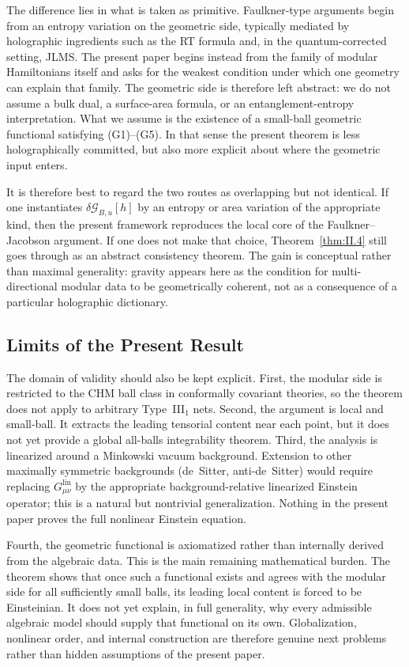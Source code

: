 \documentclass[12pt]{article}
\theoremstyle{definition}
\theoremstyle{remark}
\begin{document}
The difference lies in what is taken as primitive. Faulkner-type arguments begin from an entropy variation on the geometric side, typically mediated by holographic ingredients such as the RT formula\cite{RyuTakayanagi2006} and, in the quantum-corrected setting, JLMS\cite{JLMS2016}. The present paper begins instead from the family of modular Hamiltonians itself and asks for the weakest condition under which one geometry can explain that family. The geometric side is therefore left abstract: we do not assume a bulk dual, a surface-area formula, or an entanglement-entropy interpretation. What we assume is the existence of a small-ball geometric functional satisfying (G1)--(G5). In that sense the present theorem is less holographically committed, but also more explicit about where the geometric input enters.

It is therefore best to regard the two routes as overlapping but not identical. If one instantiates \(\delta\mathcal{G}_{B,u}[h]\) by an entropy or area variation of the appropriate kind, then the present framework reproduces the local core of the Faulkner--Jacobson argument. If one does not make that choice, Theorem~\ref{thm:II.4} still goes through as an abstract consistency theorem. The gain is conceptual rather than maximal generality: gravity appears here as the condition for multi-directional modular data to be geometrically coherent, not as a consequence of a particular holographic dictionary.

\subsection{Limits of the Present Result}\label{subsec:6.3}

The domain of validity should also be kept explicit. First, the modular side is restricted to the CHM ball class in conformally covariant theories, so the theorem does not apply to arbitrary Type~III$_1$ nets. Second, the argument is local and small-ball. It extracts the leading tensorial content near each point, but it does not yet provide a global all-balls integrability theorem. Third, the analysis is linearized around a Minkowski vacuum background. Extension to other maximally symmetric backgrounds (de~Sitter, anti-de~Sitter) would require replacing \(G^{\mathrm{lin}}_{\mu\nu}\) by the appropriate background-relative linearized Einstein operator; this is a natural but nontrivial generalization. Nothing in the present paper proves the full nonlinear Einstein equation.

Fourth, the geometric functional is axiomatized rather than internally derived from the algebraic data. This is the main remaining mathematical burden. The theorem shows that once such a functional exists and agrees with the modular side for all sufficiently small balls, its leading local content is forced to be Einsteinian. It does not yet explain, in full generality, why every admissible algebraic model should supply that functional on its own. Globalization, nonlinear order, and internal construction are therefore genuine next problems rather than hidden assumptions of the present paper.
\end{document}
